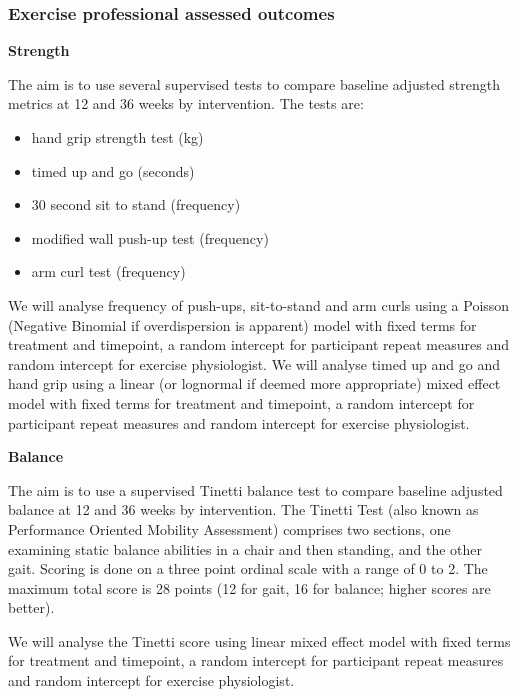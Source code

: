 \documentclass[
]{article}
\begin{document}
\hypertarget{exercise-professional-assessed-outcomes}{%
\subsubsection{Exercise professional assessed outcomes}\label{exercise-professional-assessed-outcomes}}



\textbf{Strength}

The aim is to use several supervised tests to compare baseline adjusted strength metrics at 12 and 36 weeks by intervention.
The tests are:

\begin{itemize}
\item hand grip strength test (kg)
\item timed up and go (seconds)
\item 30 second sit to stand (frequency)
\item modified wall push-up test (frequency)
\item arm curl test (frequency)

\end{itemize}

We will analyse frequency of push-ups, sit-to-stand and arm curls using a Poisson (Negative Binomial if overdispersion is apparent) model with fixed terms for treatment and timepoint, a random intercept for participant repeat measures and random intercept for exercise physiologist.
We will analyse timed up and go and hand grip using a linear (or lognormal if deemed more appropriate) mixed effect model with fixed terms for treatment and timepoint, a random intercept for participant repeat measures and random intercept for exercise physiologist.

\textbf{Balance}

The aim is to use a supervised Tinetti balance test to compare baseline adjusted balance at 12 and 36 weeks by intervention.
The Tinetti Test (also known as Performance Oriented Mobility Assessment) comprises two sections, one examining static balance abilities in a chair and then standing, and the other gait.
Scoring is done on a three point ordinal scale with a range of 0 to 2.
The maximum total score is 28 points (12 for gait, 16 for balance; higher scores are better).

We will analyse the Tinetti score using linear mixed effect model with fixed terms for treatment and timepoint, a random intercept for participant repeat measures and random intercept for exercise physiologist.
\end{document}
